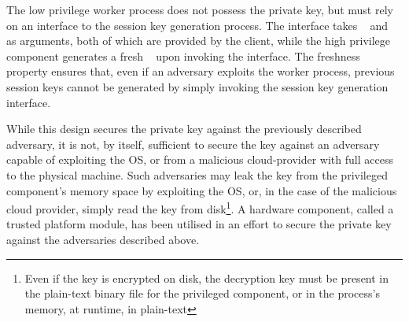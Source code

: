 \documentclass[../main.tex]{subfiles}
\begin{document}
The low privilege worker process does not possess the private key, but
must rely on an interface to the session key generation process. The
interface takes \crandom~ and \premaster~ as arguments, both of which
are provided by the client, while the high privilege component
generates a fresh \srandom~ upon invoking the interface. The freshness
property ensures that, even if an adversary exploits the worker
process, previous session keys cannot be generated by simply invoking
the session key generation interface.

While this design secures the private key against the previously
described adversary, it is not, by itself, sufficient to secure the
key against an adversary capable of exploiting the OS, or from a
malicious cloud-provider with full access to the physical
machine. Such adversaries may leak the key from the privileged
component's memory space by exploiting the OS, or, in the case of the
malicious cloud provider, simply read the key from disk\footnote{Even
  if the key is encrypted on disk, the decryption key must be present
  in the plain-text binary file for the privileged component, or in
  the process's memory, at runtime, in plain-text}.  A hardware
component, called a trusted platform module, has been utilised in an
effort to secure the private key against the adversaries described
above.
\end{document}
